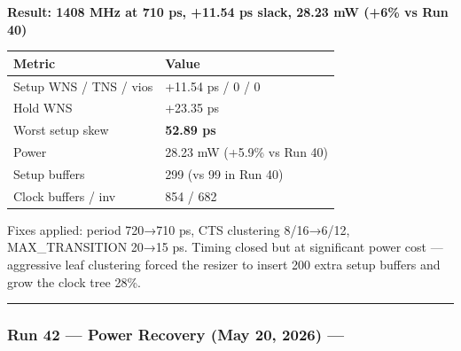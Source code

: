 \begin{record}

\textbf{Result: 1408 MHz at 710 ps, +11.54 ps slack, 28.23 mW (+6\% vs
Run 40)}

{
\begin{longtable}[]{@{}ll@{}}
\toprule\noalign{}
Metric & Value \\
\midrule\noalign{}
\endhead
\bottomrule\noalign{}
\endlastfoot
Setup WNS / TNS / vios & +11.54 ps / 0 / 0 \\
Hold WNS & +23.35 ps \\
Worst setup skew & \textbf{52.89 ps} \warn{} \\
Power & 28.23 mW (+5.9\% vs Run 40) \\
Setup buffers & 299 (vs 99 in Run 40) \\
Clock buffers / inv & 854 / 682 \\
\end{longtable}
}

Fixes applied: period 720→710 ps, CTS clustering
8/\allowbreak{}16→6/\allowbreak{}12, MAX\_\allowbreak{}TRANSITION 20→15
ps. Timing closed but at significant power cost --- aggressive leaf
clustering forced the resizer to insert 200 extra setup buffers and grow
the clock tree 28\%.

\begin{center}\rule{0.5\linewidth}{0.5pt}\end{center}

\end{record}

\subsubsection{\texorpdfstring{Run 42 --- Power Recovery \ok{} (May 20,
2026) ---
}{Run 42 --- Power Recovery  (May 20, 2026) --- }}\label{cr:run:asap7:run-42-power-recovery-white-check-mark-may-20-2026-run-2026-05-20-05-56-25}

